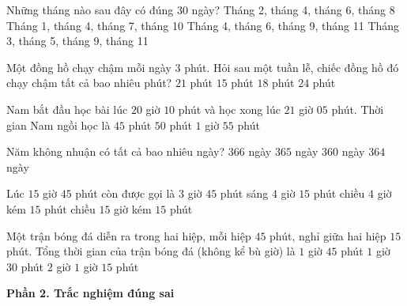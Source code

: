 \begin{ex} %
Những tháng nào sau đây có đúng 30 ngày?
\choice
{Tháng 2, tháng 4, tháng 6, tháng 8}
{Tháng 1, tháng 4, tháng 7, tháng 10}
{\True Tháng 4, tháng 6, tháng 9, tháng 11}
{Tháng 3, tháng 5, tháng 9, tháng 11}
\end{ex}

\begin{ex} %
Một đồng hồ chạy chậm mỗi ngày 3 phút. Hỏi sau một tuần lễ, chiếc đồng hồ đó chạy chậm tất cả bao nhiêu phút?
\choice
{\True $21$ phút}
{$15$ phút}
{$18$ phút}
{$24$ phút}
\end{ex}

\begin{ex} %
Nam bắt đầu học bài lúc $20$ giờ $10$ phút và học xong lúc $21$ giờ $05$ phút. Thời gian Nam ngồi học là
\choice
{$45$ phút}
{$50$ phút}
{$1$ giờ}
{\True $55$ phút}
\end{ex}

\begin{ex} %
Năm không nhuận có tất cả bao nhiêu ngày?
\choice
{$366$ ngày}
{\True $365$ ngày}
{$360$ ngày}
{$364$ ngày}
\end{ex}

\begin{ex} %
Lúc $15$ giờ $45$ phút còn được gọi là
\choice
{$3$ giờ $45$ phút sáng}
{$4$ giờ $15$ phút chiều}
{\True $4$ giờ kém $15$ phút chiều}
{$15$ giờ kém $15$ phút}
\end{ex}

\begin{ex} %
Một trận bóng đá diễn ra trong hai hiệp, mỗi hiệp $45$ phút, nghỉ giữa hai hiệp $15$ phút. Tổng thời gian của trận bóng đá (không kể bù giờ) là
\choice
{\True $1$ giờ $45$ phút}
{$1$ giờ $30$ phút}
{$2$ giờ}
{$1$ giờ $15$ phút}
\end{ex}

\textbf{Phần 2. Trắc nghiệm đúng sai}


